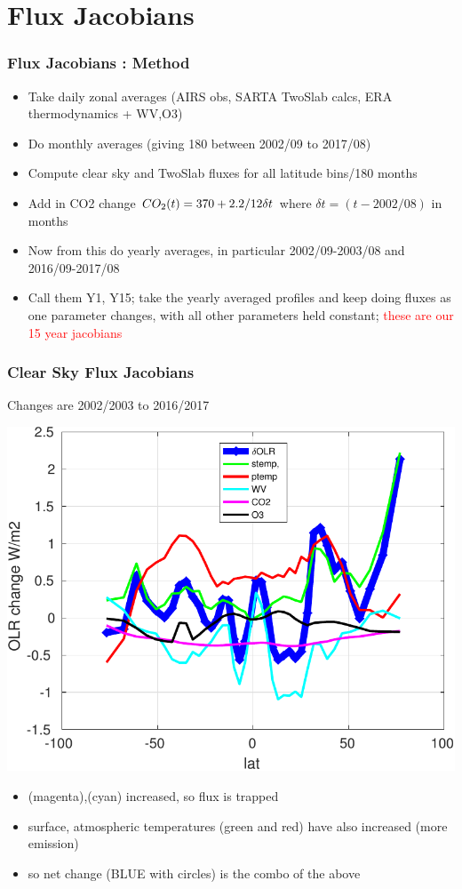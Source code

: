 \documentclass[10pt,t]{beamer}
\begin{document}
\section{Flux Jacobians}
\begin{frame}
  \frametitle{Flux Jacobians : Method}
  \begin{itemize}
  \item Take daily zonal averages (AIRS obs, SARTA TwoSlab calcs, ERA thermodynamics + WV,O3)
  \item Do monthly averages (giving 180 between 2002/09 to 2017/08)
  \item Compute clear sky and TwoSlab fluxes for all latitude bins/180 months
  \item Add in CO2 change $CO_2(t) = 370 + 2.2/12 \delta t$ where $\delta t = (t-2002/08)$ in months
  \item Now from this do yearly averages, in particular 2002/09-2003/08 and 2016/09-2017/08
  \item Call them Y1, Y15; take the yearly averaged profiles and keep doing fluxes as one parameter
    changes, with all other parameters held constant; \textcolor{red}{these are our 15 year jacobians}
  \end{itemize}
\end{frame}
\begin{frame}
  \frametitle{Clear Sky Flux Jacobians}
  Changes are 2002/2003 to 2016/2017
  \begin{center}
    \noindent\includegraphics[width=0.5\linewidth]{Figs//clrsky_temp_gas_fluxjacs.pdf}
  \end{center}
  \begin{itemize}
  \item \cd (magenta),\water (cyan) increased, so flux is trapped
  \item surface, atmospheric temperatures (green and red) have also increased (more emission)
  \item so net change (BLUE with circles) is the combo of the above
  \end{itemize}
\end{frame}
\end{document}
